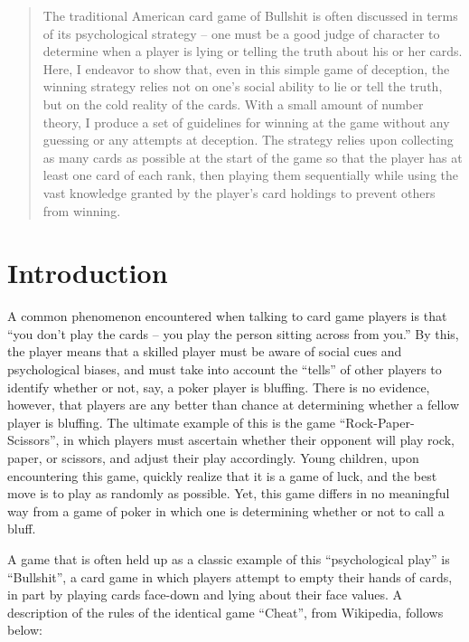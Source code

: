 \documentclass[12pt]{article}
\begin{document}
\maketitle

\begin{abstract}
The traditional American card game of Bullshit is often discussed in terms of its
psychological strategy -- one must be a good judge of character to determine when
a player is lying or telling the truth about his or her cards. Here, I endeavor
to show that, even in this simple game of deception, the winning strategy relies
not on one's social ability to lie or tell the truth, but on the cold reality of the
cards. With a small amount of number theory, I produce a set of guidelines for winning
at the game without any guessing or any attempts at deception. The strategy relies
upon collecting as many cards as possible at the start of the game so that the player
has at least one card of each rank, then playing them sequentially while using the
vast knowledge granted by the player's card holdings to prevent others from winning.
\end{abstract}

\section{Introduction}
A common phenomenon encountered when talking to card game players is that ``you don't
play the cards -- you play the person sitting across from you.'' By this, the player means
that a skilled player must be aware of social cues and psychological biases, and must
take into account the ``tells'' of other players to identify whether or not, say, a poker player is bluffing.
There is no evidence, however, that players are any better than chance at determining whether a fellow player
is bluffing. The ultimate example of this is the game ``Rock-Paper-Scissors'', in which
players must ascertain whether their opponent will play rock, paper, or scissors, and adjust
their play accordingly. Young children, upon encountering this game, quickly realize
that it is a game of luck, and the best move is to play as randomly as possible.
Yet, this game differs in no meaningful way from a game of poker in which one is determining
whether or not to call a bluff.

A game that is often held up as a classic example of this ``psychological play'' is ``Bullshit'', a card game
in which players attempt to empty their hands of cards, in part by playing cards face-down and lying
about their face values. A description of the rules of the identical game ``Cheat'', from Wikipedia, follows below:
\end{document}

